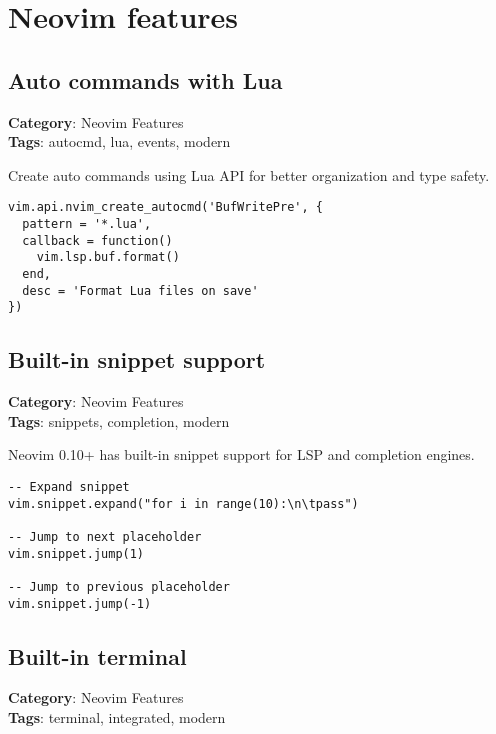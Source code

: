 {{{{{{{{{{\chapter{Neovim features}
\section{Auto commands with Lua}

\textbf{Category}: Neovim Features\\ \textbf{Tags}: autocmd, lua, events, modern
\vspace{0.5cm}

Create auto commands using Lua API for better organization and type safety.

\begin{Exa*}{}
\begin{Verbatim}[fontsize=\footnotesize, breaklines, breakanywhere]
vim.api.nvim_create_autocmd('BufWritePre', {
  pattern = '*.lua',
  callback = function()
    vim.lsp.buf.format()
  end,
  desc = 'Format Lua files on save'
})
\end{Verbatim}
\end{Exa*}

\section{Built-in snippet support}

\textbf{Category}: Neovim Features\\ \textbf{Tags}: snippets, completion, modern
\vspace{0.5cm}

Neovim 0.10+ has built-in snippet support for LSP and completion engines.

\begin{Exa*}{}
\begin{Verbatim}[fontsize=\footnotesize, breaklines, breakanywhere]
-- Expand snippet
vim.snippet.expand("for i in range(10):\n\tpass")

-- Jump to next placeholder
vim.snippet.jump(1)

-- Jump to previous placeholder
vim.snippet.jump(-1)
\end{Verbatim}
\end{Exa*}

\section{Built-in terminal}

\textbf{Category}: Neovim Features\\ \textbf{Tags}: terminal, integrated, modern
\vspace{0.5cm}

}}}}}}}}}}
